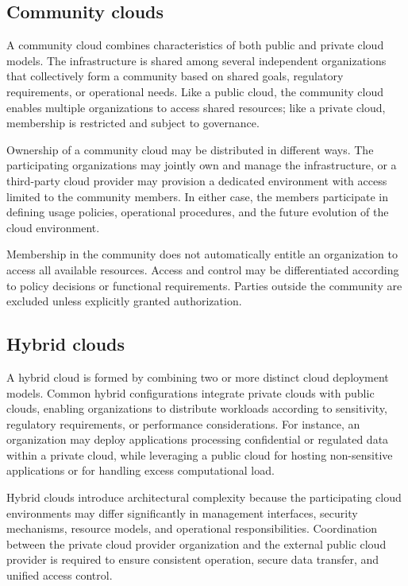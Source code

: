 \documentclass[11pt,a4paper,openany]{report}
\begin{document}
\subsection{Community clouds}

A community cloud combines characteristics of both public and private cloud models. The infrastructure is shared among several independent organizations that collectively form a community based on shared goals, regulatory requirements, or operational needs. Like a public cloud, the community cloud enables multiple organizations to access shared resources; like a private cloud, membership is restricted and subject to governance.

Ownership of a community cloud may be distributed in different ways. The participating organizations may jointly own and manage the infrastructure, or a third-party cloud provider may provision a dedicated environment with access limited to the community members. In either case, the members participate in defining usage policies, operational procedures, and the future evolution of the cloud environment.

Membership in the community does not automatically entitle an organization to access all available resources. Access and control may be differentiated according to policy decisions or functional requirements. Parties outside the community are excluded unless explicitly granted authorization.

\subsection{Hybrid clouds}

A hybrid cloud is formed by combining two or more distinct cloud deployment models. Common hybrid configurations integrate private clouds with public clouds, enabling organizations to distribute workloads according to sensitivity, regulatory requirements, or performance considerations. For instance, an organization may deploy applications processing confidential or regulated data within a private cloud, while leveraging a public cloud for hosting non-sensitive applications or for handling excess computational load.

Hybrid clouds introduce architectural complexity because the participating cloud environments may differ significantly in management interfaces, security mechanisms, resource models, and operational responsibilities. Coordination between the private cloud provider organization and the external public cloud provider is required to ensure consistent operation, secure data transfer, and unified access control.
\end{document}
